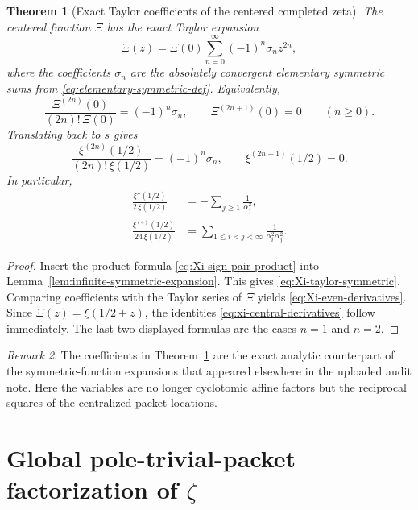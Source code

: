 \documentclass[11pt,a4paper]{article}
\newtheorem{theorem}{Theorem}[section]
\theoremstyle{definition}
\theoremstyle{remark}
\newtheorem{remark}[theorem]{Remark}
\begin{document}
\begin{theorem}[Exact Taylor coefficients of the centered completed zeta]\label{thm:Xi-taylor-coefficients}
The centered function $\Xi$ has the exact Taylor expansion
\begin{equation}\label{eq:Xi-taylor-symmetric}
\Xi(z)=\Xi(0)\sum_{n=0}^{\infty}(-1)^n\sigma_n z^{2n},
\end{equation}
where the coefficients $\sigma_n$ are the absolutely convergent elementary symmetric sums from \eqref{eq:elementary-symmetric-def}.  Equivalently,
\begin{equation}\label{eq:Xi-even-derivatives}
\frac{\Xi^{(2n)}(0)}{(2n)!\,\Xi(0)}=(-1)^n\sigma_n,
\qquad
\Xi^{(2n+1)}(0)=0
\qquad (n\ge 0).
\end{equation}
Translating back to $s$ gives
\begin{equation}\label{eq:xi-central-derivatives}
\frac{\xi^{(2n)}(1/2)}{(2n)!\,\xi(1/2)}=(-1)^n\sigma_n,
\qquad
\xi^{(2n+1)}(1/2)=0.
\end{equation}
In particular,
\begin{align}
\frac{\xi''(1/2)}{2\,\xi(1/2)}&=-\sum_{j\ge 1}\frac{1}{\alpha_j^2},\label{eq:xi-second-derivative}\\
\frac{\xi^{(4)}(1/2)}{24\,\xi(1/2)}&=\sum_{1\le i<j<\infty}\frac{1}{\alpha_i^2\alpha_j^2}.\label{eq:xi-fourth-derivative}
\end{align}
\end{theorem}

\begin{proof}
Insert the product formula \eqref{eq:Xi-sign-pair-product} into Lemma~\ref{lem:infinite-symmetric-expansion}.  This gives \eqref{eq:Xi-taylor-symmetric}.  Comparing coefficients with the Taylor series of $\Xi$ yields \eqref{eq:Xi-even-derivatives}.  Since $\Xi(z)=\xi(1/2+z)$, the identities \eqref{eq:xi-central-derivatives} follow immediately.  The last two displayed formulas are the cases $n=1$ and $n=2$.
\end{proof}

\begin{remark}
The coefficients in Theorem~\ref{thm:Xi-taylor-coefficients} are the exact analytic counterpart of the symmetric-function expansions that appeared elsewhere in the uploaded audit note.  Here the variables are no longer cyclotomic affine factors but the reciprocal squares of the centralized packet locations.
\end{remark}

\section{Global pole-trivial-packet factorization of $\zeta$}
\end{document}
